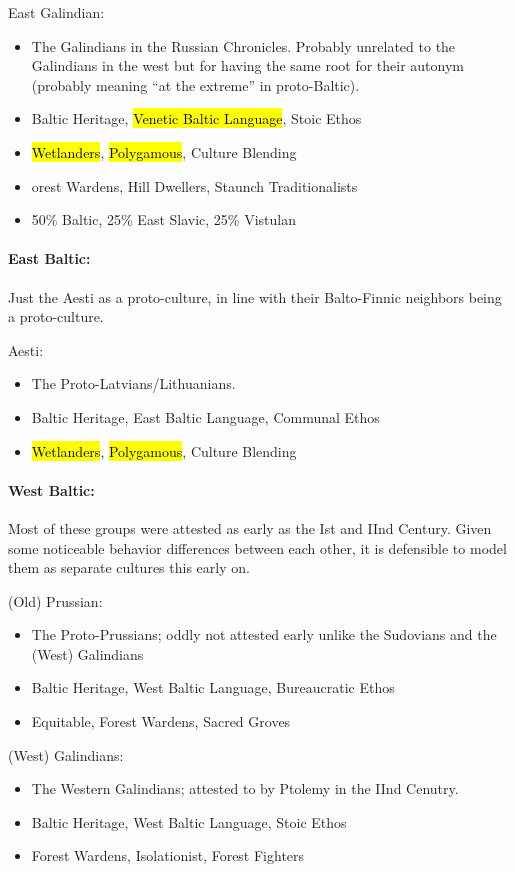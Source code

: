 \documentclass{article}
\begin{document}
	East Galindian:
	\begin{itemize}
		\item The Galindians in the Russian Chronicles. Probably unrelated to the Galindians in the west but for having the same root for their autonym (probably meaning “at the extreme” in proto-Baltic).
		\item Baltic Heritage, \hl{Venetic Baltic Language}, Stoic Ethos
		\item \hl{Wetlanders}, \hl{Polygamous}, Culture Blending
		\item orest Wardens, Hill Dwellers, Staunch Traditionalists
		\item 50\% Baltic, 25\% East Slavic, 25\% Vistulan
	\end{itemize}
	
	\paragraph{East Baltic:}
	Just the Aesti as a proto-culture, in line with their Balto-Finnic neighbors being a proto-culture.
	
	Aesti:
	\begin{itemize}
		\item The Proto-Latvians/Lithuanians.
		\item Baltic Heritage, East Baltic Language, Communal Ethos
		\item \hl{Wetlanders}, \hl{Polygamous}, Culture Blending
	\end{itemize}
	
	\paragraph{West Baltic:}
	Most of these groups were attested as early as the Ist and IInd Century.
	Given some noticeable behavior differences between each other, it is defensible to model them as separate cultures this early on.
	
	(Old) Prussian:
	\begin{itemize}
		\item The Proto-Prussians; oddly not attested early unlike the Sudovians and the (West) Galindians
		\item Baltic Heritage, West Baltic Language, Bureaucratic Ethos
		\item Equitable, Forest Wardens, Sacred Groves
	\end{itemize}
	
	(West) Galindians:
	\begin{itemize}
		\item The Western Galindians; attested to by Ptolemy in the IInd Cenutry.
		\item Baltic Heritage, West Baltic Language, Stoic Ethos
		\item Forest Wardens, Isolationist, Forest Fighters
	\end{itemize}
	
\end{document}
